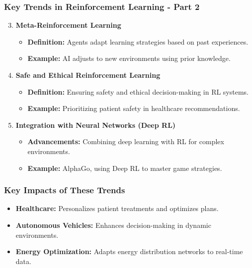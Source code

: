 \documentclass{beamer}
\begin{document}
\begin{frame}[fragile]
    \frametitle{Key Trends in Reinforcement Learning - Part 2}
    \begin{enumerate}
        \setcounter{enumi}{2} %
        \item \textbf{Meta-Reinforcement Learning}
            \begin{itemize}
                \item \textbf{Definition:} Agents adapt learning strategies based on past experiences.
                \item \textbf{Example:} AI adjusts to new environments using prior knowledge.
            \end{itemize}

        \item \textbf{Safe and Ethical Reinforcement Learning}
            \begin{itemize}
                \item \textbf{Definition:} Ensuring safety and ethical decision-making in RL systems.
                \item \textbf{Example:} Prioritizing patient safety in healthcare recommendations.
            \end{itemize}

        \item \textbf{Integration with Neural Networks (Deep RL)}
            \begin{itemize}
                \item \textbf{Advancements:} Combining deep learning with RL for complex environments.
                \item \textbf{Example:} AlphaGo, using Deep RL to master game strategies.
            \end{itemize}
    \end{enumerate}
\end{frame}

\begin{frame}[fragile]
    \frametitle{Key Impacts of These Trends}
    \begin{itemize}
        \item \textbf{Healthcare:} Personalizes patient treatments and optimizes plans.
        \item \textbf{Autonomous Vehicles:} Enhances decision-making in dynamic environments.
        \item \textbf{Energy Optimization:} Adapts energy distribution networks to real-time data.
    \end{itemize}
\end{frame}
\end{document}
